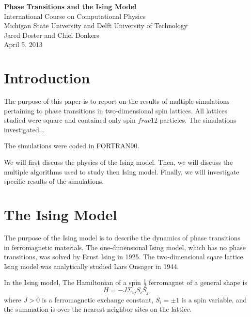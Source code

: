 \documentclass[11pt,letterpaper,fleqn]{article}
\begin{document}
\begin{center}
{\Large \textbf{Phase Transitions and the Ising Model}}\\
{International Course on Computational Physics}\\
{Michigan State University and Delft University of Technology}\\
\vspace{0.15in}
{Jared Doster and Chiel Donkers}\\
{April 5, 2013}\\
\end{center}


\section*{Introduction}

The purpose of this paper is to report on the results of multiple simulations pertaining to phase transitions in 
two-dimensional spin lattices.  All lattices studied were square and contained only spin $frac{1}{2}$ particles.
The simulations investigated...

The simulations were coded in FORTRAN90.


We will first discuss the physics of the Ising model.  Then, we will discuss the multiple algorithms used to study then
Ising model.  Finally, we will investigate specific results of the simulations.
\newline


\section*{The Ising Model}

The purpose of the Ising model is to describe the dynamics of phase transitions in ferromagnetic materials.  The one-dimensional
Ising model, which has no phase transitions, was solved by Ernst Ising in 1925.  The two-dimensional sqare lattice Ising model 
was analytically studied Lars Onsager in 1944.  


In the Ising model, The Hamiltonian of a spin $\frac{1}{2}$ ferromagnet of a general shape is
\[
H = -J \Sigma_{ij} S_{i} S_{j}
\]
where $J>0$ is a ferromagnetic exchange constant, $S_{i} = \pm1$ is a spin variable, and the summation is over the nearest-neighbor
sites on the lattice.
\end{document}
